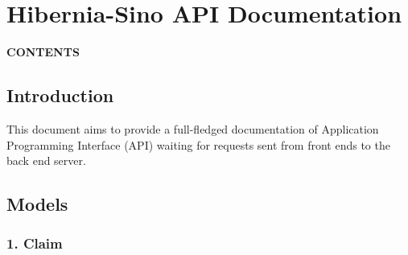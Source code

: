 \documentclass[
]{article}
\date{}
\begin{document}
\hypertarget{header-n0}{%
\section{Hibernia-Sino API Documentation}\label{header-n0}}

\textbf{CONTENTS}

\tableofcontents

\hypertarget{header-n5}{%
\subsection{Introduction}\label{header-n5}}

This document aims to provide a full-fledged documentation of
Application Programming Interface (API) waiting for requests sent from
front ends to the back end server.

\hypertarget{header-n7}{%
\subsection{Models}\label{header-n7}}

\hypertarget{header-n8}{%
\subsubsection{1. Claim}\label{header-n8}}
\end{document}
